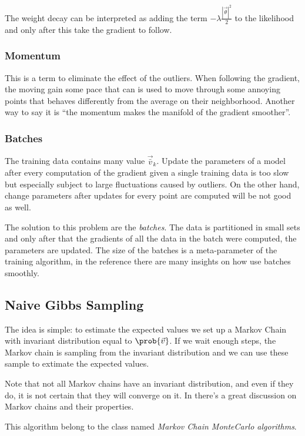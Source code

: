   The weight decay can be interpreted as adding the term \(-\lambda\frac{\left|\vec{\theta}\right|^2}{2}\)
  to the likelihood and only after this take the gradient to follow.
  \subsubsection{Momentum}
  This is a term to eliminate the effect of the outliers. When following the gradient,
  the moving gain some pace that can is used to move through some annoying points that
  behaves differently from the average on their neighborhood. Another way to say it is
  ``the momentum makes the manifold of the gradient smoother''.
  
  \subsubsection{Batches}
  The training data contains many value \(\vec{\bar{v}}_k\). Update the parameters of a model
  after every computation of the gradient given a single training data is too slow but
  especially subject to large fluctuations caused by outliers. On the other hand, change
  parameters after updates for every point are computed will be not good as well.
  
  The solution to this problem are the \emph{batches}. The data is partitioned in small sets
  and only after that the gradients of all the data in the batch were computed, the parameters
  are updated. The size of the batches is a meta-parameter of the training algorithm, in 
  the reference \cite{hinton2012practical} there are many insights on how use batches smoothly.
  
  
  \subsection{Naive Gibbs Sampling}
  The idea is simple: to estimate the expected values we set up a
  Markov Chain with invariant distribution equal to \(\prob{\vec{v}}\).
  If we wait enough steps, the Markov chain is sampling from the 
  invariant distribution and we can use these sample to extimate the
  expected values.
  
  Note that not all Markov chains have an invariant distribution, and even if they do,
  it is not certain that they will converge on it. In \cite{fischer2012introduction} there's 
  a great discussion on Markov chains and their properties.
  
  This algorithm belong to the class named \emph{Markov Chain MonteCarlo algorithms}.
  
